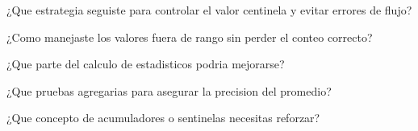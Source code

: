 
\begin{DoxyEnumerate}
\item ¿\+Que estrategia seguiste para controlar el valor centinela y evitar errores de flujo?
\item ¿\+Como manejaste los valores fuera de rango sin perder el conteo correcto?
\item ¿\+Que parte del calculo de estadisticos podria mejorarse?
\item ¿\+Que pruebas agregarias para asegurar la precision del promedio?
\item ¿\+Que concepto de acumuladores o sentinelas necesitas reforzar? 
\end{DoxyEnumerate}